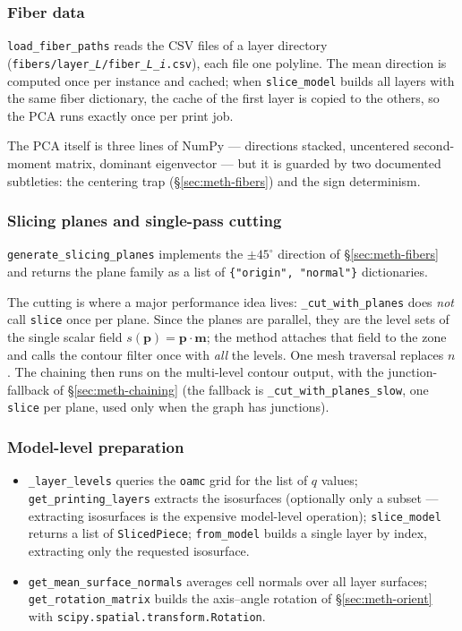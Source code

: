 \subsubsection{Fiber data}

\texttt{load\_fiber\_paths} reads the CSV files of a layer directory
(\texttt{fibers/layer\_\textit{L}/fiber\_\textit{L}\_\textit{i}.csv}),
each file one polyline. The mean direction is computed once per
instance and cached; when \texttt{slice\_model} builds all layers with
the same fiber dictionary, the cache of the first layer is copied to
the others, so the PCA runs exactly once per print job.

The PCA itself is three lines of NumPy --- directions stacked, uncentered
second-moment matrix, dominant eigenvector --- but it is guarded by two
documented subtleties: the centering trap (\S\ref{sec:meth-fibers}) and
the sign determinism.

\subsubsection{Slicing planes and single-pass cutting}

\texttt{generate\_slicing\_planes} implements the $\pm45^\circ$
direction of \S\ref{sec:meth-fibers} and returns the plane family as a
list of \texttt{\{"origin", "normal"\}} dictionaries.

The cutting is where a major performance idea lives:
\texttt{\_cut\_with\_planes} does \emph{not} call \texttt{slice} once
per plane. Since the planes are parallel, they are the level sets of the
single scalar field $s(\mathbf{p}) = \mathbf{p}\cdot\mathbf{m}$; the
method attaches that field to the zone and calls the contour filter
once with \emph{all} the levels. One mesh traversal replaces $n$. The
chaining then runs on the multi-level contour output, with the
junction-fallback of \S\ref{sec:meth-chaining} (the fallback is
\texttt{\_cut\_with\_planes\_slow}, one \texttt{slice} per plane, used
only when the graph has junctions).

\subsubsection{Model-level preparation}

\begin{itemize}
  \item \texttt{\_layer\_levels} queries the \texttt{oamc} grid for the
        list of $q$ values; \texttt{get\_printing\_layers} extracts the
        isosurfaces (optionally only a subset --- extracting isosurfaces
        is the expensive model-level operation); \texttt{slice\_model}
        returns a list of \texttt{SlicedPiece};
        \texttt{from\_model} builds a single layer by index, extracting
        only the requested isosurface.
  \item \texttt{get\_mean\_surface\_normals} averages cell normals over
        all layer surfaces; \texttt{get\_rotation\_matrix} builds the
        axis--angle rotation of \S\ref{sec:meth-orient} with
        \texttt{scipy.spatial.transform.Rotation}.
\end{itemize}

